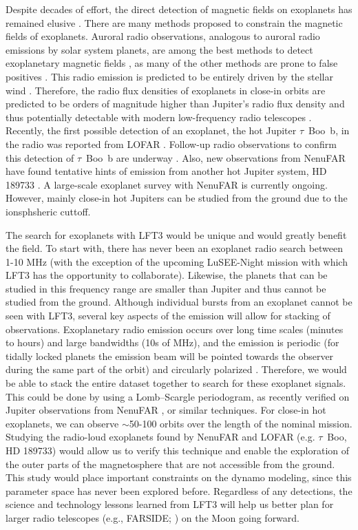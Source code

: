 Despite decades of effort, the direct detection of magnetic fields on exoplanets has remained elusive \citep{G2015,Brain2024}. There are many methods proposed to constrain the magnetic fields of exoplanets. Auroral radio observations, analogous to auroral radio emissions by solar system planets, are among the best methods to detect exoplanetary magnetic fields \citep{Zarka2007,Zarka2015SKA,G2015,Brain2024}, as many of the other methods are prone to false positives \citep{G2015,Turner2016a,Route2019}. This radio emission is predicted to be entirely driven by the stellar wind \citep{Zarka2007}. Therefore, the radio flux densities of exoplanets in close-in orbits are predicted to be orders of magnitude higher than Jupiter's radio flux density \citep{Griessmeier2007_AA,Griessmeier17PREVIII} and thus potentially detectable with modern low-frequency radio telescopes \citep{Zarka2015SKA,Griessmeier17PREVIII,Turner2019}. Recently, the first possible detection of an exoplanet, the hot Jupiter $\tau$~Boo~b, in the radio was reported from LOFAR \citep{Turner2021_Radio}. Follow-up radio observations to confirm this detection of $\tau$~Boo~b are underway \citep{Turner2023_PRE,Turner2024}. Also, new observations from NenuFAR have found tentative hints of emission from another hot Jupiter system, HD 189733 \citep{Zhang2025}. A large-scale exoplanet survey with NenuFAR is currently ongoing. However, mainly close-in hot Jupiters can be studied from the ground due to the ionsphsheric cuttoff. 

The search for exoplanets with LFT3 would be unique and would greatly benefit the field. To start with, there has never been an exoplanet radio search between 1-10 MHz (with the exception of the upcoming LuSEE-Night mission with which LFT3 has the opportunity to collaborate). Likewise, the planets that can be studied in this frequency range are smaller than Jupiter and thus cannot be studied from the ground. Although individual bursts from an exoplanet cannot be seen with LFT3, several key aspects of the emission will allow for stacking of observations. Exoplanetary radio emission occurs over long time scales (minutes to hours) and large bandwidths (10s of MHz), and the emission is periodic (for tidally locked planets the emission beam will be pointed towards the observer during the same part of the orbit) and circularly polarized \citep{Zarka2007}. Therefore, we would be able to stack the entire dataset together to search for these exoplanet signals. This could be done by using a Lomb–Scargle periodogram, as recently verified on Jupiter observations from NenuFAR \citep{Louis2025}, or similar techniques. For close-in hot exoplanets, we can observe $\sim$50-100 orbits over the length of the nominal mission. Studying the radio-loud exoplanets found by NenuFAR and LOFAR (e.g. $\tau$~Boo, HD 189733) would allow us to verify this technique and enable the exploration of the outer parts of the magnetosphere that are not accessible from the ground. This study would place important constraints on the dynamo modeling, since this parameter space has never been explored before. Regardless of any detections, the science and technology lessons learned from LFT3 will help us better plan for larger radio telescopes (e.g., FARSIDE; \citealt{Burns2021_RSPTA}) on the Moon going forward.

